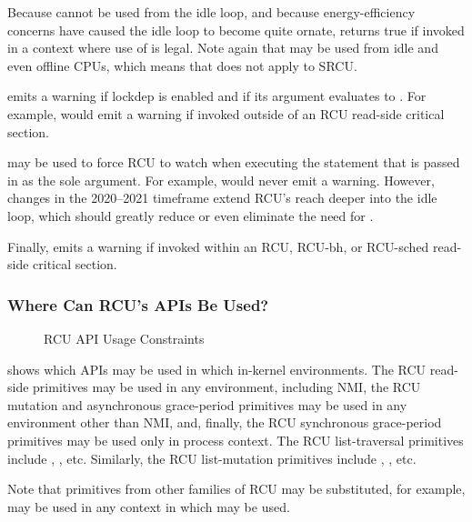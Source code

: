 Because  cannot be used from the idle loop,
and because energy-efficiency concerns have caused the idle loop
to become quite ornate,  returns true if
invoked in a context where use of  is legal.
Note again that  may be used from idle and
even offline CPUs, which means that  does not
apply to SRCU\@.

 emits a warning if lockdep is enabled and if
its argument evaluates to .
For example,  would emit a
warning if invoked outside of an RCU read-side critical section.

 may be used to force RCU to watch when executing
the statement that is passed in as the sole argument.
For example, 
would never emit a warning.
However, changes in the 2020--2021 timeframe extend RCU's reach deeper
into the idle loop, which should greatly reduce or even eliminate the
need for .

Finally,   emits a warning if invoked within
an RCU, RCU-bh, or RCU-sched read-side critical section.

\subsubsection{Where Can RCU's APIs Be Used?}
\label{sec:defer:Where Can RCU's APIs Be Used?}

\begin{figure}
\centering
{}
\caption{RCU API Usage Constraints}
\label{fig:defer:RCU API Usage Constraints}
\end{figure}

shows which APIs may be used in which in-kernel environments.
The RCU read-side primitives may be used in any environment, including NMI,
the RCU mutation and asynchronous grace-period primitives may be used in any
environment other than NMI, and, finally, the RCU synchronous grace-period
primitives may be used only in process context.
The RCU list-traversal primitives include ,
, etc.
Similarly, the RCU list-mutation primitives include
, , etc.

Note that primitives from other families of RCU may be substituted,
for example,  may be used in any context
in which  may be used.

